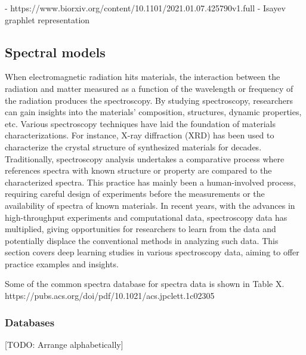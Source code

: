 \documentclass[pdflatex,sn-mathphys]{sn-jnl}%
\theoremstyle{thmstyleone}%
\theoremstyle{thmstyletwo}%
\theoremstyle{thmstylethree}%
\begin{document}
- https://www.biorxiv.org/content/10.1101/2021.01.07.425790v1.full
- Isayev graphlet representation





\subsection{Spectral models}\label{sec:spectral}

When electromagnetic radiation hits materials, the interaction between the radiation and matter measured as a function of the wavelength or frequency of the radiation produces the spectroscopy. By studying spectroscopy, researchers can gain insights into the materials’ composition, structures, dynamic properties, etc. Various spectroscopy techniques have laid the foundation of materials characterizations. For instance, X-ray diffraction (XRD) has been used to characterize the crystal structure of synthesized materials for decades. Traditionally, spectroscopy analysis undertakes a comparative process where references spectra with known structure or property are compared to the characterized spectra. This practice has mainly been a human-involved process, requiring careful design of experiments before the measurements or the availability of spectra of known materials. In recent years, with the advances in high-throughput experiments and computational data, spectroscopy data has multiplied, giving opportunities for researchers to learn from the data and potentially displace the conventional methods in analyzing such data. This section covers deep learning studies in various spectroscopy data, aiming to offer practice examples and insights.

Some of the common spectra database for spectra data is shown in Table X.
https://pubs.acs.org/doi/pdf/10.1021/acs.jpclett.1c02305
\subsubsection{Databases}


[TODO: Arrange alphabetically]
\end{document}
